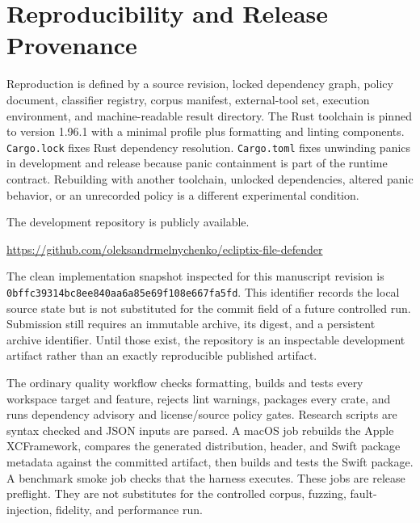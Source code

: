 \section{Reproducibility and Release Provenance}\label{sec:reproducibility}

Reproduction is defined by a source revision, locked dependency graph, policy
document, classifier registry, corpus manifest, external-tool set, execution
environment, and machine-readable result directory. The Rust toolchain is
pinned to version 1.96.1 with a minimal profile plus formatting and linting
components. \texttt{Cargo.lock} fixes Rust dependency resolution.
\texttt{Cargo.toml} fixes unwinding panics in development and release because
panic containment is part of the runtime contract. Rebuilding with another
toolchain, unlocked dependencies, altered panic behavior, or an unrecorded
policy is a different experimental condition.

The development repository is publicly available.
{\raggedright
\url{https://github.com/oleksandrmelnychenko/ecliptix-file-defender}\par}
The clean implementation snapshot inspected for this manuscript revision is
\texttt{0bffc39314bc8ee8\allowbreak 40aa6a85e69f108e\allowbreak 667fa5fd}.
This identifier records the
local source state but is not substituted for the commit field of a future
controlled run. Submission still requires an immutable archive, its digest,
and a persistent archive identifier. Until those exist, the repository is an
inspectable development artifact rather than an exactly reproducible published
artifact.

The ordinary quality workflow checks formatting, builds and tests every
workspace target and feature, rejects lint warnings, packages every crate, and
runs dependency advisory and license/source policy gates. Research scripts are
syntax checked and JSON inputs are parsed. A macOS job rebuilds the Apple
XCFramework, compares the generated distribution, header, and Swift package
metadata against the committed artifact, then builds and tests the Swift
package. A benchmark smoke job checks that the harness executes. These jobs
are release preflight. They are not substitutes for the controlled corpus,
fuzzing, fault-injection, fidelity, and performance run.

